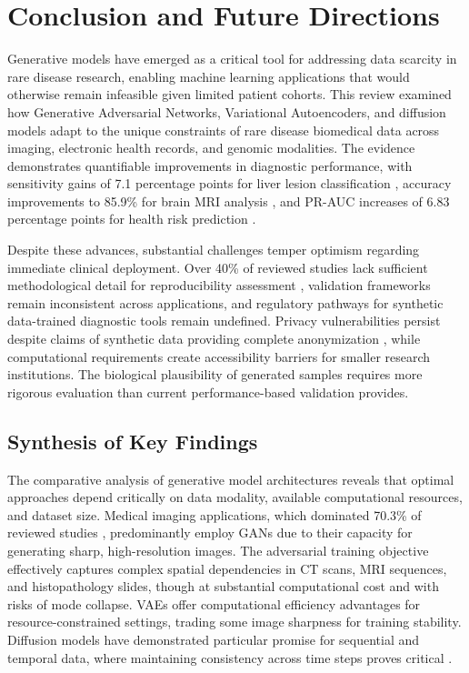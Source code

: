 \section{Conclusion and Future Directions}
\label{sec:conclusion}

Generative models have emerged as a critical tool for addressing data scarcity in rare disease research, enabling machine learning applications that would otherwise remain infeasible given limited patient cohorts. This review examined how Generative Adversarial Networks, Variational Autoencoders, and diffusion models adapt to the unique constraints of rare disease biomedical data across imaging, electronic health records, and genomic modalities. The evidence demonstrates quantifiable improvements in diagnostic performance, with sensitivity gains of 7.1 percentage points for liver lesion classification \cite{fridadar2018gan}, accuracy improvements to 85.9\% for brain MRI analysis \cite{mendes2025synthetic}, and PR-AUC increases of 6.83 percentage points for health risk prediction \cite{zhong2024meddiffusion}.

Despite these advances, substantial challenges temper optimism regarding immediate clinical deployment. Over 40\% of reviewed studies lack sufficient methodological detail for reproducibility assessment \cite{finetti2025data}, validation frameworks remain inconsistent across applications, and regulatory pathways for synthetic data-trained diagnostic tools remain undefined. Privacy vulnerabilities persist despite claims of synthetic data providing complete anonymization \cite{mendes2025synthetic}, while computational requirements create accessibility barriers for smaller research institutions. The biological plausibility of generated samples requires more rigorous evaluation than current performance-based validation provides.

\subsection{Synthesis of Key Findings}

The comparative analysis of generative model architectures reveals that optimal approaches depend critically on data modality, available computational resources, and dataset size. Medical imaging applications, which dominated 70.3\% of reviewed studies \cite{finetti2025data}, predominantly employ GANs due to their capacity for generating sharp, high-resolution images. The adversarial training objective effectively captures complex spatial dependencies in CT scans, MRI sequences, and histopathology slides, though at substantial computational cost and with risks of mode collapse. VAEs offer computational efficiency advantages for resource-constrained settings, trading some image sharpness for training stability. Diffusion models have demonstrated particular promise for sequential and temporal data, where maintaining consistency across time steps proves critical \cite{zhong2024meddiffusion}.

